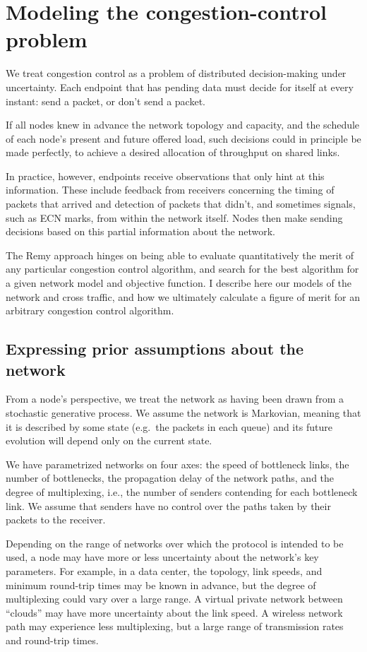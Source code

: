 \section{Modeling the congestion-control problem}
\label{s:model}

We treat congestion control as a problem of distributed
decision-making under uncertainty. Each endpoint that has pending data
must decide for itself at every instant: send a packet, or don't
send a packet.

If all nodes knew in advance the network topology and capacity, and the
schedule of each node's present and future offered load, such
decisions could in principle be made perfectly, to achieve a desired
allocation of throughput on shared links.

In practice, however, endpoints receive observations that only hint at
this information. These include feedback from receivers concerning the
timing of packets that arrived and detection of packets that didn't, and
sometimes signals, such as ECN marks, from within the network itself.
Nodes then make sending decisions based on this partial information
about the network.

The Remy approach hinges on being able to evaluate quantitatively the
merit of any particular congestion control algorithm, and search for
the best algorithm for a given network model and objective function. I
describe here our models of the network and cross traffic, and how we
ultimately calculate a figure of merit for an arbitrary congestion
control algorithm.

\subsection{Expressing prior assumptions about the network}

From a node's perspective, we treat the network as having been drawn
from a stochastic generative process. We assume the network is
Markovian, meaning that it is described by some state (e.g.~the
packets in each queue) and its future evolution will depend only on
the current state.

We have parametrized networks on four axes: the speed of
bottleneck links, the number of bottlenecks, the propagation delay of the network paths, and the
degree of multiplexing, i.e., the number of senders contending for
each bottleneck link. We assume that senders have no control over the
paths taken by their packets to the receiver.

Depending on the range of networks over which the protocol is intended
to be used, a node may have more or less uncertainty about the
network's key parameters. For example, in a data center, the topology,
link speeds, and minimum round-trip times may be known in advance, but
the degree of multiplexing could vary over a large range. A virtual
private network between ``clouds'' may have more uncertainty about the
link speed. A wireless network path may experience less multiplexing,
but a large range of transmission rates and round-trip times.

